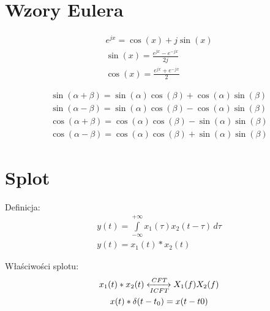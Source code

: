\section{Wzory Eulera}
% 
\begin{multicols}{2}
    \begin{gather*}
        e^{jx} = \cos{(x)} + j\sin{(x)}\\
        \sin{(x)} = \frac{e^{jx}-e^{-jx}}{2j}\\
        \cos{(x)} = \frac{e^{jx}+e^{-jx}}{2}
    \end{gather*}
 
    \begin{gather*}
        \sin{(\alpha+\beta)} = \sin{(\alpha)}\cos{(\beta)} + \cos{(\alpha)}\sin{(\beta)}\\
        \sin{(\alpha-\beta)} = \sin{(\alpha)}\cos{(\beta)} - \cos{(\alpha)}\sin{(\beta)}\\
        \cos{(\alpha+\beta)} = \cos{(\alpha)}\cos{(\beta)} - \sin{(\alpha)}\sin{(\beta)}\\
        \cos{(\alpha-\beta)} = \cos{(\alpha)}\cos{(\beta)} + \sin{(\alpha)}\sin{(\beta)}
    \end{gather*}
\end{multicols}

\section{Splot}
    Definicja:
    \begin{gather*}
        y(t) = \int \limits _{-\infty}^{+\infty}x_1(\tau) x_2(t-\tau) \,d\tau\\
        y(t) = x_1(t)*x_2(t) 
    \end{gather*}

    Właściwości splotu:
    \begin{gather*}
        x_1(t)*x_2(t)\xleftrightarrow[ICFT]{CFT} X_1(f)X_2(f)\\
        x(t)*\delta(t-t_0) = x(t-t0)
    \end{gather*}